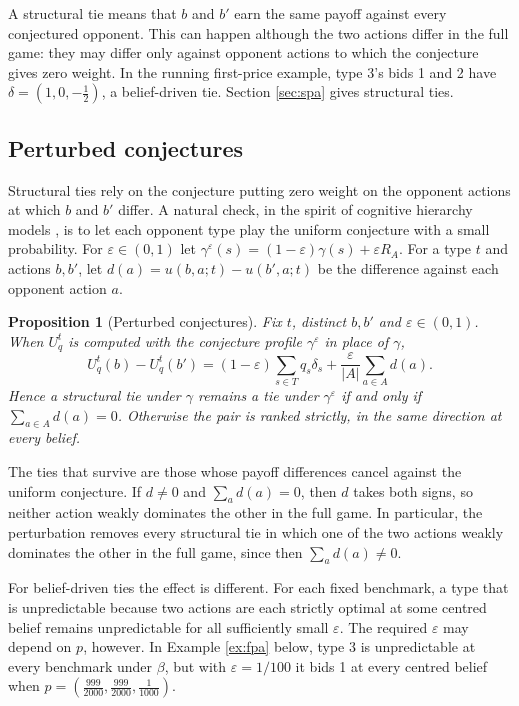 \documentclass[12pt]{article}
\newtheorem{proposition}{Proposition}
\theoremstyle{definition}
\begin{document}
A structural tie means that $b$ and $b'$ earn the same payoff against every conjectured opponent. This can happen although the two actions differ in the full game: they may differ only against opponent actions to which the conjecture gives zero weight. In the running first-price example, type 3's bids 1 and 2 have $\delta = (1, 0, -\tfrac12)$, a belief-driven tie. Section \ref{sec:spa} gives structural ties.

\subsection{Perturbed conjectures}\label{sec:perturb}

Structural ties rely on the conjecture putting zero weight on the opponent actions at which $b$ and $b'$ differ. A natural check, in the spirit of cognitive hierarchy models \citep{camerer2004cognitive}, is to let each opponent type play the uniform conjecture with a small probability. For $\varepsilon \in (0, 1)$ let $\gamma^\varepsilon(s) = (1 - \varepsilon)\gamma(s) + \varepsilon R_A$. For a type $t$ and actions $b, b'$, let $d(a) = u(b, a; t) - u(b', a; t)$ be the difference against each opponent action $a$.

\begin{proposition}[Perturbed conjectures]\label{prop:perturb}
Fix $t$, distinct $b, b'$ and $\varepsilon \in (0,1)$. When $U^t_q$ is computed with the conjecture profile $\gamma^\varepsilon$ in place of $\gamma$,
\[
U^t_q(b) - U^t_q(b') = (1-\varepsilon) \sum_{s \in T} q_s \delta_s + \frac{\varepsilon}{|A|} \sum_{a \in A} d(a).
\]
Hence a structural tie under $\gamma$ remains a tie under $\gamma^\varepsilon$ if and only if $\sum_{a \in A} d(a) = 0$. Otherwise the pair is ranked strictly, in the same direction at every belief.
\end{proposition}

The ties that survive are those whose payoff differences cancel against the uniform conjecture. If $d \neq 0$ and $\sum_a d(a) = 0$, then $d$ takes both signs, so neither action weakly dominates the other in the full game. In particular, the perturbation removes every structural tie in which one of the two actions weakly dominates the other in the full game, since then $\sum_a d(a) \neq 0$.

For belief-driven ties the effect is different. For each fixed benchmark, a type that is unpredictable because two actions are each strictly optimal at some centred belief remains unpredictable for all sufficiently small $\varepsilon$. The required $\varepsilon$ may depend on $p$, however. In Example \ref{ex:fpa} below, type 3 is unpredictable at every benchmark under $\beta$, but with $\varepsilon = 1/100$ it bids 1 at every centred belief when $p = (\tfrac{999}{2000}, \tfrac{999}{2000}, \tfrac{1}{1000})$.
\end{document}
